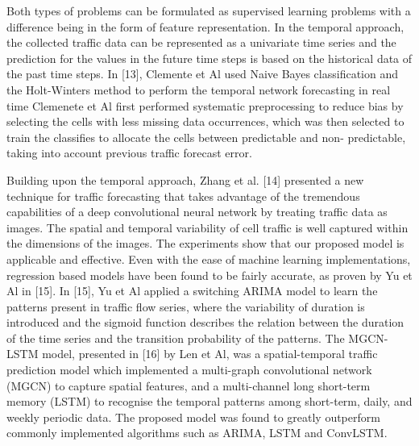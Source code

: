 \documentclass[conference]{IEEEtran}
\begin{document}
Both types of problems can be formulated as supervised learning problems with a difference being in the form of feature representation. In the temporal approach, the collected traffic data can be represented as a univariate time series and the prediction for the values in the future time steps is based on the historical data of the past time steps. In [13], Clemente et Al used Naive Bayes classification and the Holt-Winters method to perform the temporal network forecasting in real time Clemenete et Al first performed systematic preprocessing to reduce bias by selecting the cells with less missing data occurrences, which was then selected to train the classifies to allocate the cells between predictable and non- predictable, taking into account previous traffic forecast error. 

Building upon the temporal approach, Zhang et al. [14] presented a new technique for traffic forecasting that takes advantage of the tremendous capabilities of a deep convolutional neural network by treating traffic data as images. The spatial and temporal variability of cell traffic is well captured within the dimensions of the images. The experiments show that our proposed model is applicable and effective. Even with the ease of machine learning implementations, regression based models have been found to be fairly accurate, as proven by Yu et Al in [15]. In [15], Yu et Al applied a switching ARIMA model to learn the patterns present in traffic flow series, where the variability of duration is introduced and the sigmoid function describes the relation between the duration of the time series and the transition probability of the patterns. The MGCN-LSTM model, presented in [16] by Len et Al, was a spatial-temporal traffic prediction model which implemented a multi-graph convolutional network (MGCN) to capture spatial features, and a multi-channel long short-term memory (LSTM) to recognise the temporal patterns among short-term, daily, and weekly periodic data. The proposed model was found to greatly outperform commonly implemented algorithms such as ARIMA, LSTM and ConvLSTM.
\end{document}
